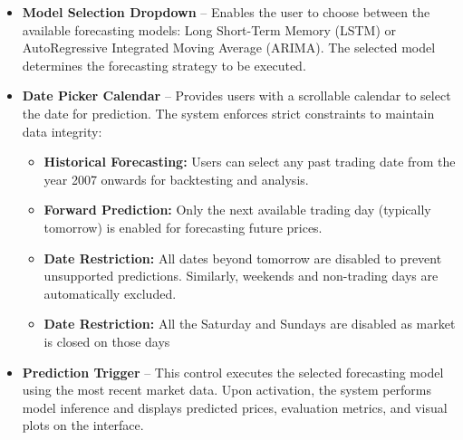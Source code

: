 \begin{itemize}
	\item \textbf{Model Selection Dropdown} – Enables the user to choose between the available forecasting models: Long Short-Term Memory (LSTM) or AutoRegressive Integrated Moving Average (ARIMA). The selected model determines the forecasting strategy to be executed.
	
\item \textbf{Date Picker Calendar} – Provides users with a scrollable calendar to select the date for prediction. The system enforces strict constraints to maintain data integrity:
\begin{itemize}
	\item \textbf{Historical Forecasting:} Users can select any past trading date from the year 2007 onwards for backtesting and analysis.
	\item \textbf{Forward Prediction:} Only the next available trading day (typically tomorrow) is enabled for forecasting future prices.
	\item \textbf{Date Restriction:} All dates beyond tomorrow are disabled to prevent unsupported predictions. Similarly, weekends and non-trading days are automatically excluded.
	\item \textbf{Date Restriction:} All the Saturday and Sundays are disabled as market is closed on those days
\end{itemize}
	
	\item \textbf{Prediction Trigger} – This control executes the selected forecasting model using the most recent market data. Upon activation, the system performs model inference and displays predicted prices, evaluation metrics, and visual plots on the interface.

\end{itemize}